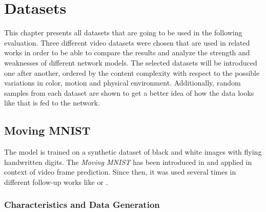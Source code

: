 
\chapter{Datasets} \label{chapter:datasets}

This chapter presents all datasets that are going to be used in the following evaluation. Three different video datasets were chosen that are used in related works in order to be able to compare the results and analyze the strength and weaknesses of different network models. The selected datasets will be introduced one after another, ordered by the content complexity with respect to the possible variations in color, motion and physical environment. Additionally, random samples from each dataset are shown to get a better idea of how the data looks like that is fed to the network.


\section{Moving MNIST} \label{sec:ds_mm}


The model is trained on a synthetic dataset of black and white images with flying handwritten digits. The \textit{Moving MNIST} has been introduced in \parencite{unsup_learn_lstm} and applied in context of video frame prediction. Since then, it was used several times in different follow-up works like \parencite{spat_temp_video_autoenc} or \parencite{conv_lstm_nowcasting}. 

\subsection{Characteristics and Data Generation}

